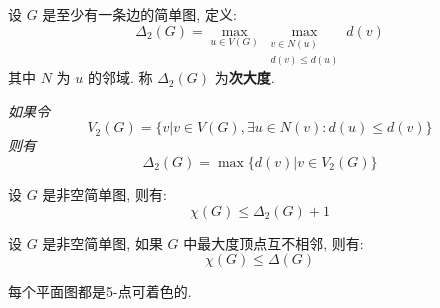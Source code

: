 \begin{definition}[次大度]
    设 \(G\) 是至少有一条边的简单图, 定义:
    \[\Delta_2(G)= \max_{u \in V(G)} \max_{\substack{v \in N(u) \\
    d(v) \le d(u)}}d(v)\]
    其中 \(N\) 为 \(u\) 的邻域. 称 \(\Delta_2(G)\) 为\textbf{次大度}.
\end{definition}

\textit{
    如果令
    \[V_2(G) = \{v|v \in V(G), \exists u \in N(v): d(u) \le d(v)\}\]
    则有
    \[\Delta_2(G) = \max\{d(v)|v \in V_2(G)\}\]
}

\begin{theorem}
    设 \(G\) 是非空简单图, 则有:
    \[\chi(G) \le \Delta_2(G) + 1\]
\end{theorem}

\begin{lemma}
    设 \(G\) 是非空简单图, 如果 \(G\) 中最大度顶点互不相邻, 则有:
    \[\chi(G) \le \Delta(G)\]
\end{lemma}

\begin{theorem}
    每个平面图都是5-点可着色的.
\end{theorem}